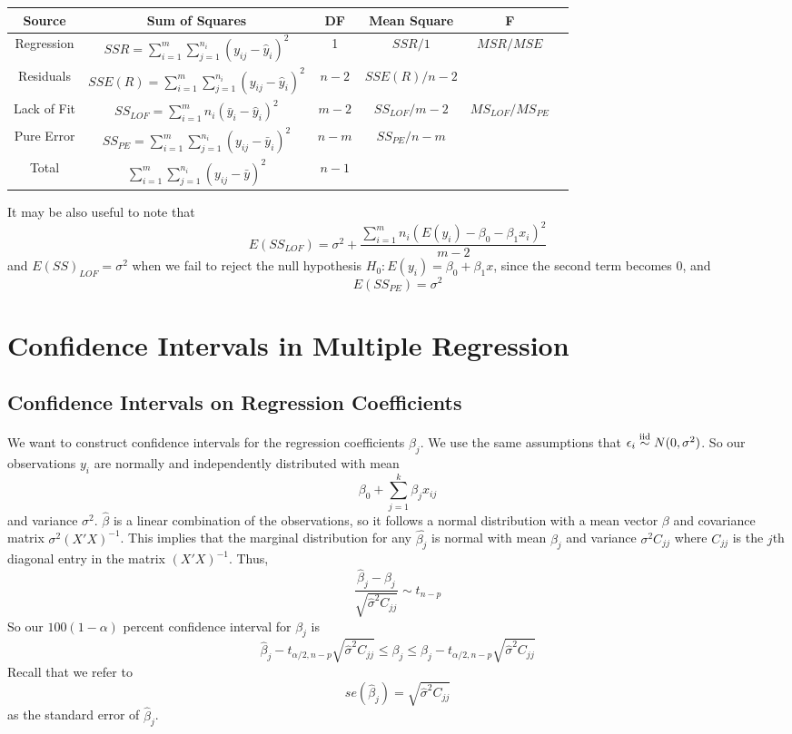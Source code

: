 \begin{center}
    \begin{tabular}{|c|c|c|c|c|c|}
        \hline
        Source & Sum of Squares & DF & Mean Square & F\\
        \hline 
        \hline 
        Regression & $SSR = \sum\limits_{i=1}^m\sum\limits_{j=1}^{n_i} (y_{ij} - \hat{y}_i)^2$ & 1 & $SSR/1$ & $MSR/MSE$ \\
        \hline
        Residuals & $SSE(R) = \sum\limits_{i=1}^m\sum\limits_{j=1}^{n_i}(y_{ij} - \hat{y}_i)^2$ & $n-2$ & $SSE(R)/n-2$ & \\
        \hline
        Lack of Fit & $SS_{LOF} = \sum\limits_{i=1}^m n_i(\bar{y}_i - \hat{y}_i)^2$ & $m-2$ & $SS_{LOF}/m-2$ & $MS_{LOF}/MS_{PE}$\\
        \hline
        Pure Error & $SS_{PE} = \sum\limits_{i=1}^m\sum\limits_{j=1}^{n_i} (y_{ij}-\bar{y}_i)^2$ & $n-m$ & $SS_{PE}/n-m$ & \\
        \hline
        Total & $\sum\limits_{i=1}^m\sum\limits_{j=1}^{n_i}(y_{ij} - \bar{y})^2$ & $n-1$ & & \\
        \hline
    \end{tabular}
\end{center}
It may be also useful to note that 
\[E(SS_{LOF}) = \sigma^2 + \frac{\sum_{i=1}^m n_i(E(y_i) - \beta_0 - \beta_1x_i)^2}{m-2}\]
and $E(SS)_{LOF} = \sigma^2$ when we fail to reject the null hypothesis $H_0: E(y_i) = \beta_0 + \beta_1x$, since the second term becomes 0, and 
\[E(SS_{PE}) = \sigma^2\] 

\section{Confidence Intervals in Multiple Regression}

\subsection{Confidence Intervals on Regression Coefficients}

We want to construct confidence intervals for the regression coefficients $\beta_j$. We use the same assumptions that $\epsilon_i \overset{\mathrm{iid}}{\sim} N(0, \sigma^2)$. So our observations $y_i$ are normally and independently distributed with mean 
\[\beta_0 + \sum_{j=1}^k \beta_jx_{ij}\]
and variance $\sigma^2$. $\hat{\beta}$ is a linear combination of the observations, so it follows a normal distribution with a mean vector $\beta$ and covariance matrix $\sigma^2(X'X)^{-1}$. This implies that the marginal distribution for any $\hat{\beta_j}$ is normal with mean $\beta_j$ and variance $\sigma^2C_{jj}$ where $C_{jj}$ is the $j$th diagonal entry in the matrix $(X'X)^{-1}$. Thus, 
\[\frac{\hat{\beta}_j-\beta_j}{\sqrt{\hat{\sigma}^2C_{jj}}} \sim t_{n-p}\]
So our $100(1-\alpha)$ percent confidence interval for $\beta_j$ is 
\[\hat{\beta}_j - t_{\alpha/2,n-p}\sqrt{\hat{\sigma}^2C_{jj}} \leq \beta_j \leq \hat{\beta}_j - t_{\alpha/2,n-p}\sqrt{\hat{\sigma}^2C_{jj}}\]
Recall that we refer to
\[se(\hat{\beta}_j) = \sqrt{\hat{\sigma}^2C_{jj}}\]
as the standard error of $\hat{\beta}_j$.

